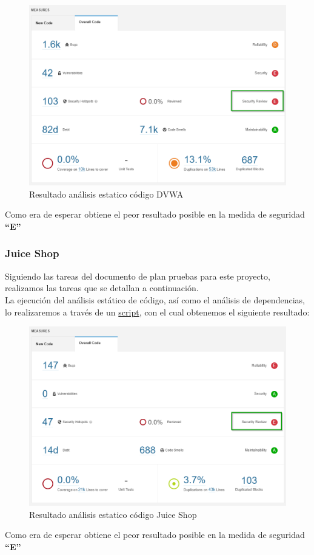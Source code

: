 \begin{figure}[h!]  
    \includegraphics[width=\linewidth]{./imagenes/07_AnalisisEstatico__DVWA.png}
    \caption{Resultado análisis estatico código DVWA}  
    \label{fig:7}
\end{figure}
Como era de esperar obtiene el peor resultado posible en la medida de seguridad \textbf{“E”}
\newpage
\subsubsection{Juice Shop}
Siguiendo las tareas del documento de plan pruebas para este proyecto, realizamos las tareas que se detallan a continuación.\\

La ejecución del análisis estático de código, así como el análisis de dependencias, lo realizaremos a través de un 
\href{https://github.com/M0l1n3ta/PFG/blob/master/Scripts/STAT/RunSonarScaner_JuiceShop.ps1}{script}, con el cual obtenemos 
el siguiente resultado:\\

\begin{figure}[h!]
    \centering  
    \includegraphics[width=\linewidth]{./imagenes/08_AnalisisEstatico_JuiceShop.png}
    \caption{Resultado análisis estatico código Juice Shop}  
    \label{fig:8}
\end{figure}
Como era de esperar obtiene el peor resultado posible en la medida de seguridad \textbf{“E”}
\newpage
